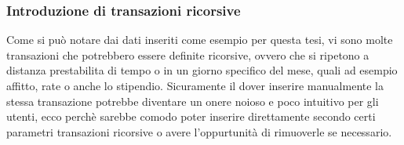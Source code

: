 \documentclass[binding=0.6cm, oneside, noexaminfo, italian]{sapthesis}
\begin{document}
\subsubsection{Introduzione di transazioni ricorsive}
Come si può notare dai dati inseriti come esempio per questa tesi, vi sono molte transazioni che potrebbero essere definite ricorsive, ovvero che si ripetono a distanza prestabilita di tempo o in un giorno specifico del mese, quali ad esempio affitto, rate o anche lo stipendio. Sicuramente il dover inserire manualmente la stessa transazione potrebbe diventare un onere noioso e poco intuitivo per gli utenti, ecco perchè sarebbe comodo poter inserire direttamente secondo certi parametri transazioni ricorsive o avere l'oppurtunità di rimuoverle se necessario.
\end{document}

